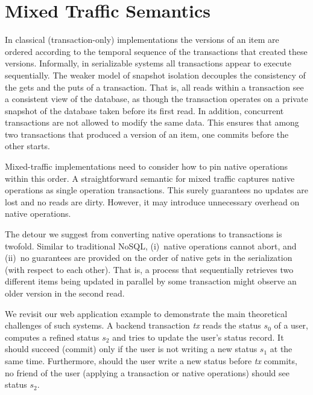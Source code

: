 \section{Mixed Traffic Semantics}
\label{sec:semantics}

In classical (transaction-only) implementations the
versions of an item are ordered according to the temporal sequence of the
transactions that created these versions. Informally, in serializable systems all
transactions appear to execute sequentially. The weaker model of snapshot isolation decouples the consistency of the gets and the puts of a transaction.
That is, all reads within a transaction see a consistent view of the
database, as though the transaction operates on a private snapshot of the
database taken before its first read. 
In addition, concurrent transactions are not allowed to modify the same data.
This 
ensures that among two transactions that produced a version of an
item, one commits before the other starts.  

Mixed-traffic implementations need to consider how
to pin native operations within this order.
A straightforward semantic for mixed traffic captures native
operations as single operation transactions. This surely guarantees no
updates are lost and no reads are dirty.
However, it may introduce unnecessary overhead on native operations.


The detour we suggest from converting native operations to transactions is
twofold.
Similar to traditional NoSQL, (i)~native operations cannot abort, and 
(ii)~no guarantees are provided
on the order of native gets in the serialization (with respect 
to each other). 
That is, a process that sequentially retrieves two different items being 
updated in parallel by some transaction might observe an older version in the 
second read. 


We revisit our web application example to demonstrate the main
theoretical challenges of such systems.
A backend transaction \emph{tx} reads the status $s_0$ of a user, computes a refined status $s_2$ and tries to
update the user's status record. It should succeed (commit) only if the user is
not writing a new status $s_1$ at the same time. Furthermore, should the user write
a new status before \emph{tx} commits, no friend of the user (applying a
transaction or native operations) should see status $s_2$.

